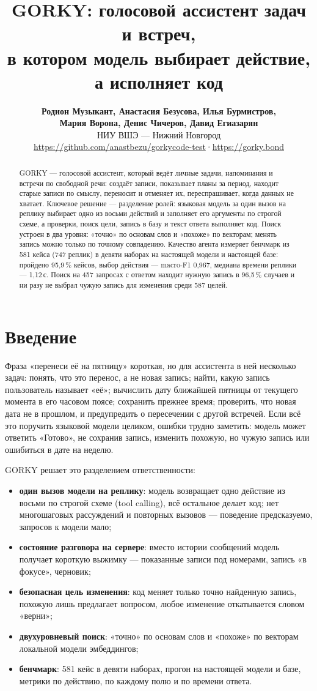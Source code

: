 \documentclass[10pt,a4paper,twocolumn]{article}
\title{\bfseries GORKY: голосовой ассистент задач и встреч,\\
  в котором модель выбирает действие, а исполняет код}
\author{%
  \textbf{Родион Музыкант, Анастасия Безусова, Илья Бурмистров,}\\
  \textbf{Мария Ворона, Денис Чичеров, Давид Егиазарян}\\[2pt]
  НИУ ВШЭ — Нижний Новгород\\[2pt]
  \small\url{https://github.com/anastbezu/gorkycode-test}\quad·\quad\url{https://gorky.bond}}
\date{}
\begin{document}
\maketitle

\begin{abstract}
GORKY — голосовой ассистент, который ведёт личные задачи, напоминания и встречи по
свободной речи: создаёт записи, показывает планы за период, находит старые записи по
смыслу, переносит и отменяет их, переспрашивает, когда данных не хватает. Ключевое
решение — разделение ролей: языковая модель за один вызов на реплику выбирает одно из
восьми действий и заполняет его аргументы по строгой схеме, а проверки, поиск цели,
запись в базу и текст ответа выполняет код. Поиск устроен в два уровня: «точно» по
основам слов и «похоже» по векторам; менять запись можно только по точному совпадению.
Качество агента измеряет бенчмарк из 581 кейса (747 реплик) в девяти наборах на
настоящей модели и настоящей базе: пройдено 95,9\,\% кейсов, выбор действия —
macro-F1 0,967, медиана времени реплики — 1,12\,с. Поиск на 457 запросах с ответом
находит нужную запись в 96,5\,\% случаев и ни разу не выбрал чужую запись для изменения
среди 587 целей.
\end{abstract}

\section{Введение}

Фраза «перенеси её на пятницу» короткая, но для ассистента в ней несколько задач:
понять, что это перенос, а не новая запись; найти, какую запись пользователь называет
«её»; вычислить дату ближайшей пятницы от текущего момента в его часовом поясе;
сохранить прежнее время; проверить, что новая дата не в прошлом, и предупредить о
пересечении с другой встречей. Если всё это поручить языковой модели целиком, ошибки
трудно заметить: модель может ответить «Готово», не сохранив запись, изменить похожую,
но чужую запись или ошибиться в дате на неделю.

GORKY решает это разделением ответственности:
\begin{itemize}
  \item \textbf{один вызов модели на реплику}: модель возвращает одно действие из восьми
    по строгой схеме (tool calling), всё остальное делает код; нет многошаговых
    рассуждений и повторных вызовов — поведение предсказуемо, запросов к модели мало;
  \item \textbf{состояние разговора на сервере}: вместо истории сообщений модель получает
    короткую выжимку — показанные записи под номерами, запись «в фокусе», черновик;
  \item \textbf{безопасная цель изменения}: код меняет только точно найденную запись,
    похожую лишь предлагает вопросом, любое изменение откатывается словом «верни»;
  \item \textbf{двухуровневый поиск}: «точно» по основам слов и «похоже» по векторам
    локальной модели эмбеддингов;
  \item \textbf{бенчмарк}: 581 кейс в девяти наборах, прогон на настоящей модели и базе,
    метрики по действию, по каждому полю и по времени ответа.
\end{itemize}
\end{document}
